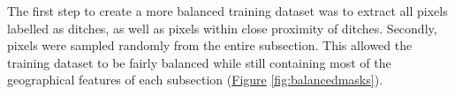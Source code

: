 \documentclass[]{interact}
\theoremstyle{plain}%
\theoremstyle{definition}
\theoremstyle{remark}
\begin{document}
The first step to create a more balanced training dataset was to extract all pixels labelled as ditches, as well as pixels within close proximity of ditches. Secondly, pixels were sampled randomly from the entire subsection. This allowed the training dataset to be fairly balanced while still containing most of the geographical features of each subsection (\hyperref[fig:balancedmasks]{Figure} \ref{fig:balancedmasks}).

\begin{figure} [!htb]
    \centering
    \hspace{5pt}
    \subfigure[]{
}
\end{figure}
\end{document}
